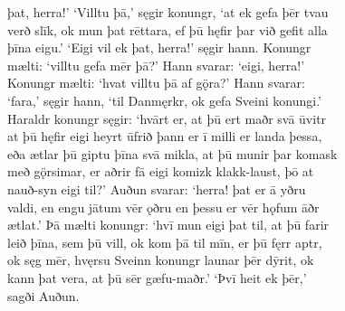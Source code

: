 \documentclass[12pt,letterpaper]{book}
\begin{document}
\begin{linenumbers}
þat, herra!'  `Villtu þā,' sęgir konungr, `at ek gefa þēr tvau\\
verð slīk, ok mun þat rēttara, ef þū hęfir þar við gefit alla\\
þīna eigu.'  `Eigi vil ek þat, herra!' sęgir hann.  Konungr\\
mælti: `villtu gefa mēr þā?'  Hann svarar: `eigi, herra!'\\
Konungr mælti: `hvat villtu þā af gǫ̈ra?'  Hann svarar:\\
`fara,' sęgir hann, `til Danmęrkr, ok gefa Sveini konungi.'\\
Haraldr konungr sęgir: `hvārt er, at þū ert maðr svā ūvitr\\
at þū hęfir eigi heyrt ūfrið þann er ī milli er landa þessa,\\
eða ætlar þū giptu þīna svā mikla, at þū munir þar komask\\
með gǫ̈rsimar, er aðrir fā eigi komizk klakk-laust, þō at\\
nauð-syn eigi til?'  Auðun svarar: `herra! þat er ā yðru\\
valdi, en engu jātum vēr ǫðru en þessu er vēr hǫfum āðr\\
ætlat.'  Þā mælti konungr: `hvī mun eigi þat til, at þū farir\\
leið þīna, sem þū vill, ok kom þā til mīn, er þū fęrr aptr,\\
ok sęg mēr, hvęrsu Sveinn konungr launar þēr dȳrit, ok\\
kann þat vera, at þū sēr gæfu-maðr.'  `Þvī heit ek þēr,'\\
sagði Auðun.


\end{linenumbers}
\end{document}
